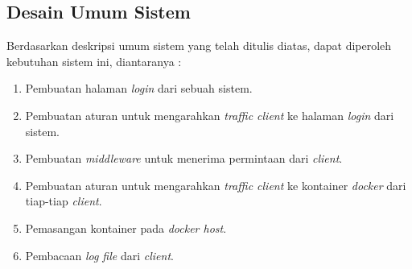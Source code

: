     \subsection{Desain Umum Sistem}
      \indent Berdasarkan deskripsi umum sistem yang telah ditulis diatas, dapat diperoleh kebutuhan sistem ini, diantaranya :
        \begin{enumerate}
        \item Pembuatan halaman \textit{login} dari sebuah sistem.
        \item Pembuatan aturan untuk mengarahkan \textit{traffic client} ke halaman \textit{login} dari sistem.
        \item Pembuatan \textit{middleware} untuk menerima permintaan dari \textit{client}.
        \item Pembuatan aturan untuk mengarahkan \textit{traffic client} ke kontainer \textit{docker} dari tiap-tiap \textit{client}.
        \item Pemasangan kontainer pada \textit{docker host}.
        \item Pembacaan \textit{log file} dari \textit{client}.
        \end{enumerate} 
      
